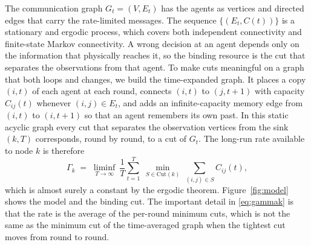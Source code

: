 \documentclass[journal]{IEEEtran}
\theoremstyle{definition}
\theoremstyle{remark}
\newcommand{\Gk}{\Gamma_k}
\begin{document}
The communication graph $G_t=(V,E_t)$ has the agents as vertices and directed edges that carry the rate-limited
messages. The sequence $\{(E_t,C(t))\}$ is a stationary and ergodic process, which covers both independent
connectivity and finite-state Markov connectivity. A wrong decision at an agent depends only on the information
that physically reaches it, so the binding resource is the cut that separates the observations from that agent.
To make cuts meaningful on a graph that both loops and changes, we build the time-expanded graph. It places a
copy $(i,t)$ of each agent at each round, connects $(i,t)$ to $(j,t+1)$ with capacity $C_{ij}(t)$ whenever
$(i,j)\in E_t$, and adds an infinite-capacity memory edge from $(i,t)$ to $(i,t+1)$ so that an agent remembers its
own past. In this static acyclic graph every cut that separates the observation vertices from the sink $(k,T)$
corresponds, round by round, to a cut of $G_t$. The long-run rate available to node $k$ is therefore
\begin{equation}
\Gk \;=\; \liminf_{T\to\infty}\ \frac1T\sum_{t=1}^{T}\ \min_{S\in\mathrm{Cut}(k)}\ \sum_{(i,j)\in S} C_{ij}(t),
\label{eq:gammak}
\end{equation}
which is almost surely a constant by the ergodic theorem. Figure~\ref{fig:model} shows the model and the binding
cut. The important detail in \eqref{eq:gammak} is that the rate is the average of the per-round minimum cuts,
which is not the same as the minimum cut of the time-averaged graph when the tightest cut moves from round to
round.
\end{document}
